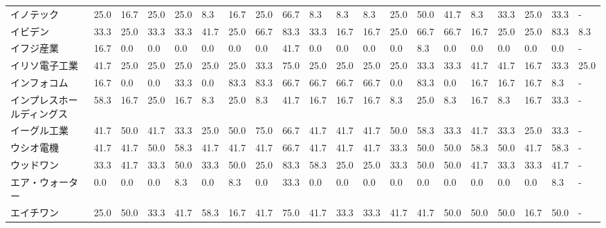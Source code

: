 \documentclass[a4paper，11pt]{jsarticle}
\begin{document}
\begin{longtable}[c]{lp{3mm}p{3mm}p{3mm}p{3mm}p{3mm}p{3mm}p{3mm}p{3mm}p{3mm}p{3mm}p{3mm}p{3mm}p{3mm}p{3mm}p{3mm}p{3mm}p{3mm}p{3mm}p{3mm}}
イノテック           &   25.0 &   16.7 &      25.0 &      25.0 &        8.3 &   16.7 &   25.0 &   66.7 &     8.3 &     8.3 &    8.3 &  25.0 &   50.0 &    41.7 &     8.3 &  33.3 &  25.0 &  33.3 &     - \\
イビデン            &   33.3 &   25.0 &      33.3 &      33.3 &       41.7 &   25.0 &   66.7 &   83.3 &    33.3 &    16.7 &   16.7 &  25.0 &   66.7 &    66.7 &    16.7 &  25.0 &  25.0 &  83.3 &   8.3 \\
イフジ産業           &   16.7 &    0.0 &       0.0 &       0.0 &        0.0 &    0.0 &    0.0 &   41.7 &     0.0 &     0.0 &    0.0 &   0.0 &    8.3 &     0.0 &     0.0 &   0.0 &   0.0 &   0.0 &     - \\
イリソ電子工業         &   41.7 &   25.0 &      25.0 &      25.0 &       25.0 &   25.0 &   33.3 &   75.0 &    25.0 &    25.0 &   25.0 &  25.0 &   33.3 &    33.3 &    41.7 &  41.7 &  16.7 &  33.3 &  25.0 \\
インフォコム          &   16.7 &    0.0 &       0.0 &      33.3 &        0.0 &   83.3 &   83.3 &   66.7 &    66.7 &    66.7 &   66.7 &   0.0 &   83.3 &     0.0 &    16.7 &  16.7 &  16.7 &   8.3 &     - \\
インプレスホールディングス   &   58.3 &   16.7 &      25.0 &      16.7 &        8.3 &   25.0 &    8.3 &   41.7 &    16.7 &    16.7 &   16.7 &   8.3 &   25.0 &     8.3 &    16.7 &   8.3 &  16.7 &  33.3 &     - \\
イーグル工業          &   41.7 &   50.0 &      41.7 &      33.3 &       25.0 &   50.0 &   75.0 &   66.7 &    41.7 &    41.7 &   41.7 &  50.0 &   58.3 &    33.3 &    41.7 &  33.3 &  25.0 &  33.3 &     - \\
ウシオ電機           &   41.7 &   41.7 &      50.0 &      58.3 &       41.7 &   41.7 &   41.7 &   66.7 &    41.7 &    41.7 &   41.7 &  33.3 &   50.0 &    50.0 &    58.3 &  50.0 &  41.7 &  58.3 &     - \\
ウッドワン           &   33.3 &   41.7 &      33.3 &      50.0 &       33.3 &   50.0 &   25.0 &   83.3 &    58.3 &    25.0 &   25.0 &  33.3 &   50.0 &    50.0 &    41.7 &  33.3 &  33.3 &  41.7 &     - \\
エア・ウォーター        &    0.0 &    0.0 &       0.0 &       8.3 &        0.0 &    8.3 &    0.0 &   33.3 &     0.0 &     0.0 &    0.0 &   0.0 &    0.0 &     0.0 &     0.0 &   0.0 &   0.0 &   8.3 &     - \\
エイチワン           &   25.0 &   50.0 &      33.3 &      41.7 &       58.3 &   16.7 &   41.7 &   75.0 &    41.7 &    33.3 &   33.3 &  41.7 &   41.7 &    50.0 &    50.0 &  50.0 &  16.7 &  50.0 &     - \\

\end{longtable}
\end{document}
